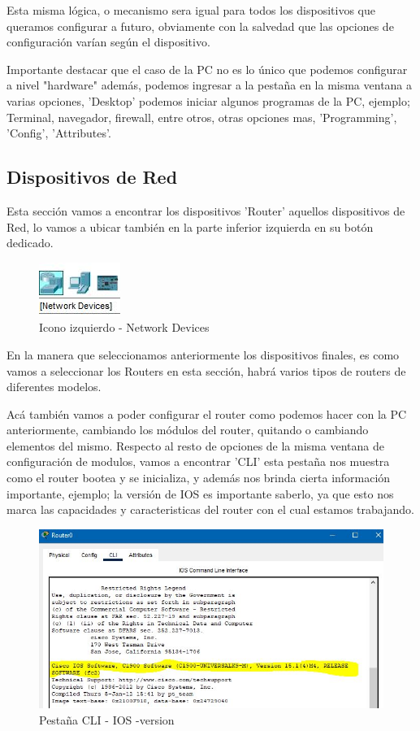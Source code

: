 \documentclass{article}
\begin{document}
Esta misma lógica, o mecanismo sera igual para todos los dispositivos que queramos configurar a futuro, obviamente con la salvedad que las opciones de configuración varían según el dispositivo.

Importante destacar que el caso de la PC no es lo único que podemos configurar a nivel "hardware" además, podemos ingresar a la pestaña en la misma ventana a varias opciones, 'Desktop' podemos iniciar algunos programas de la PC, ejemplo; Terminal, navegador, firewall, entre otros, otras opciones mas, 'Programming', 'Config', 'Attributes'.

\subsection{Dispositivos de Red}
Esta sección vamos a encontrar los dispositivos 'Router' aquellos dispositivos de Red, lo vamos a ubicar también en la parte inferior izquierda en su botón dedicado.
\begin{figure}[H]
    \centering
    \includegraphics[width=0.25\linewidth]{lCaptura.JPG}
    \caption{Icono izquierdo - Network Devices}
\end{figure}
En la manera que seleccionamos anteriormente los dispositivos finales, es como vamos a seleccionar los Routers en esta sección, habrá varios tipos de routers de diferentes modelos.

Acá también vamos a poder configurar el router como podemos hacer con la PC anteriormente, cambiando los módulos del router, quitando o cambiando elementos del mismo. Respecto al resto de opciones de la misma ventana de configuración de modulos, vamos a encontrar 'CLI' esta pestaña nos muestra como el router bootea y se inicializa, y además nos brinda cierta información importante, ejemplo; la versión de IOS es importante saberlo, ya que esto nos marca las capacidades y caracteristicas del router con el cual estamos trabajando.

\begin{figure}[H]
    \centering
    \includegraphics[width=0.75\linewidth]{cap1.JPG}
    \caption{Pestaña CLI - IOS -version}
\end{figure}
\end{document}
